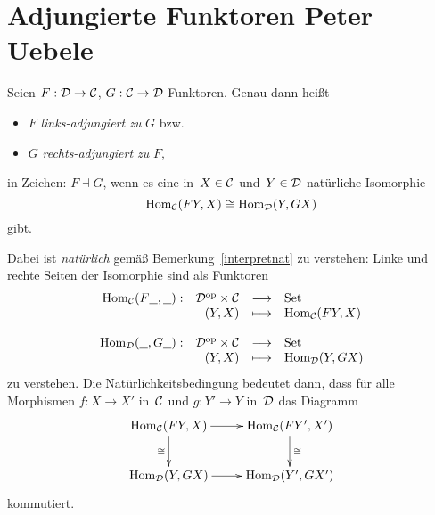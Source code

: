 \section[Adjungierte Funktoren]{Adjungierte Funktoren \hfill \small Peter
Uebele}




\begin{defn}
Seien $F:\mathcal{D}\to\mathcal{C}$, $G:\mathcal{C}\to\mathcal{D}$ Funktoren. Genau dann heißt
\begin{itemize}
\item 
$F$ \emph{links-adjungiert zu} $G$ bzw.
\item 
$G$ \emph{rechts-adjungiert zu} $F$,
\end{itemize}
in Zeichen: $F \dashv G$, wenn es eine in~$X \in \mathcal{C}$ und~$Y \in \mathcal{D}$ natürliche
Isomorphie
\[ \mathrm{Hom}_{\mathcal{C}}(FY,X) \cong \mathrm{Hom}_{\mathcal{D}}(Y,GX) \]
gibt.
\end{defn}
Dabei ist \emph{natürlich} gemäß Bemerkung~\ref{interpretnat} zu verstehen:
Linke und rechte Seiten der Isomorphie sind als Funktoren
\[ \begin{array}{@{}rrcl@{}}
  \Hom_\C(F\freist,\freist) :&
    \D^\op \times \C &\longrightarrow& \Set \\
  & (Y,X) &\longmapsto& \Hom_\C(FY, X) \\\\
  \Hom_\D(\freist,G\freist) :&
    \D^\op \times \C &\longrightarrow& \Set \\
  & (Y,X) &\longmapsto& \Hom_\D(Y, GX)
\end{array} \]
zu verstehen. Die Natürlichkeitsbedingung bedeutet dann, dass
für alle Morphismen $f:X\rightarrow X'$ in~$\mathcal{C}$ und
$g:Y'\rightarrow Y$ in~$\mathcal{D}$ das Diagramm
\[ \xymatrix{
  \Hom_\C(FY,X) \ar[d]_\cong \ar[r] & \Hom_\C(FY',X') \ar[d]^\cong \\
  \Hom_\D(Y,GX) \ar[r] & \Hom_\D(Y',GX')
} \]
kommutiert.
